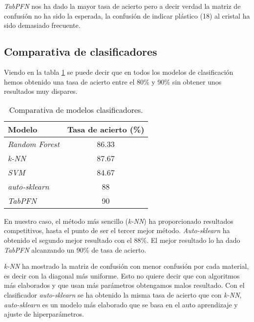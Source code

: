\textit{TabPFN} nos ha dado la mayor tasa de acierto pero a decir verdad la matriz de confusión no ha sido la esperada, la confusión de indicar plástico (18) al cristal ha sido demasiado frecuente.
\clearpage

\subsection{Comparativa de clasificadores}

Viendo en la tabla \ref{tab:comparativa} se puede decir que en todos los modelos de clasificación hemos obtenido una tasa de acierto entre el 80\% y 90\% sin obtener unos resultados muy dispares.

\begin{table}[h]
\begin{center}
\begin{tabular}{|l|c|}
\hline
\rowcolor[gray]{0.9} 
\textbf{Modelo} & \textbf{Tasa de acierto (\%)} \\ \hline
\textit{Random Forest}   & 86.33                         \\ \hline
\rowcolor[gray]{0.9} 
\textit{k-NN}            & 87.67                         \\ \hline
\textit{SVM}             & 84.67                         \\ \hline
\rowcolor[gray]{0.9} 
\textit{auto-sklearn}    & 88                            \\ \hline
\textit{TabPFN}          & 90                            \\ \hline
\end{tabular}
\caption{Comparativa de modelos clasificadores.}
\label{tab:comparativa}
\end{center}
\end{table}

En nuestro caso, el método más sencillo (\textit{k-NN}) ha proporcionado resultados competitivos, hasta el punto de ser el tercer mejor método. \textit{Auto-sklearn} ha obtenido el segundo mejor resultado con el 88\%. El mejor resultado lo ha dado \textit{TabPFN} alcanzando un 90\% de tasa de acierto.

\textit{k-NN} ha mostrado la matriz de confusión con menor confusión por cada material, es decir con la diagonal más uniforme. Esto no quiere decir que con algoritmos más elaborados y que usan más parámetros obtengamos malos resultado. Con el clasificador \textit{auto-sklearn} se ha obtenido la misma tasa de acierto que con \textit{k-NN}, \textit{auto-sklearn} es un modelo más elaborado que se basa en el auto aprendizaje y ajuste de hiperparámetros.

